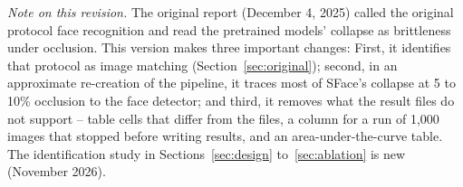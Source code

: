 \noindent\textit{Note on this revision.} The original report (December 4, 2025) called the original protocol face recognition and read the pretrained models' collapse as brittleness under occlusion. This version makes three important changes: First, it identifies that protocol as image matching (Section~\ref{sec:original}); second, in an approximate re-creation of the pipeline, it traces most of SFace's collapse at 5 to 10\% occlusion to the face detector; and third, it removes what the result files do not support -- table cells that differ from the files, a column for a run of 1,000 images that stopped before writing results, and an area-under-the-curve table. The identification study in Sections~\ref{sec:design} to~\ref{sec:ablation} is new (November 2026).
